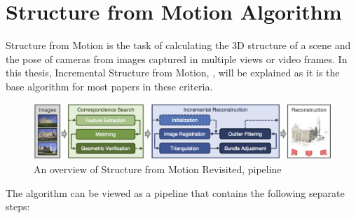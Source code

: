 \documentclass[11pt]{article}
\begin{document}
    \section{Structure from Motion Algorithm}
    Structure from Motion is the task of calculating the 3D structure of a scene and the pose of cameras from
    images captured in multiple views or video frames. In this thesis, Incremental Structure from Motion, \cite{7780814}, will be explained
    as it is the base algorithm for most papers in these criteria.

    \begin{figure}
    \centering
    \includegraphics[width=\textwidth,height=\textheight,keepaspectratio]{images/sfm.png}
    \caption{An overview of Structure from Motion Revisited, \cite{7780814} pipeline}
    \end{figure}

    The algorithm can be viewed as a pipeline that contains the following separate steps:
\end{document}
